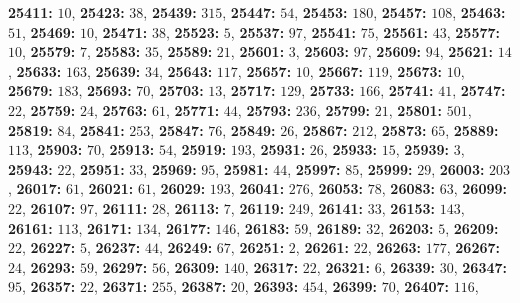 \textsf{\bfseries 25411:} $10$, \textsf{\bfseries 25423:} $38$, \textsf{\bfseries 25439:} $315$, \textsf{\bfseries 25447:} $54$, \textsf{\bfseries 25453:} $180$, \textsf{\bfseries 25457:} $108$, \textsf{\bfseries 25463:} $51$, \textsf{\bfseries 25469:} $10$, \textsf{\bfseries 25471:} $38$, \textsf{\bfseries 25523:} $5$, \textsf{\bfseries 25537:} $97$, \textsf{\bfseries 25541:} $75$, \textsf{\bfseries 25561:} $43$, \textsf{\bfseries 25577:} $10$, \textsf{\bfseries 25579:} $7$, \textsf{\bfseries 25583:} $35$, \textsf{\bfseries 25589:} $21$, \textsf{\bfseries 25601:} $3$, \textsf{\bfseries 25603:} $97$, \textsf{\bfseries 25609:} $94$, \textsf{\bfseries 25621:} $14$, \textsf{\bfseries 25633:} $163$, \textsf{\bfseries 25639:} $34$, \textsf{\bfseries 25643:} $117$, \textsf{\bfseries 25657:} $10$, \textsf{\bfseries 25667:} $119$, \textsf{\bfseries 25673:} $10$, \textsf{\bfseries 25679:} $183$, \textsf{\bfseries 25693:} $70$, \textsf{\bfseries 25703:} $13$, \textsf{\bfseries 25717:} $129$, \textsf{\bfseries 25733:} $166$, \textsf{\bfseries 25741:} $41$, \textsf{\bfseries 25747:} $22$, \textsf{\bfseries 25759:} $24$, \textsf{\bfseries 25763:} $61$, \textsf{\bfseries 25771:} $44$, \textsf{\bfseries 25793:} $236$, \textsf{\bfseries 25799:} $21$, \textsf{\bfseries 25801:} $501$, \textsf{\bfseries 25819:} $84$, \textsf{\bfseries 25841:} $253$, \textsf{\bfseries 25847:} $76$, \textsf{\bfseries 25849:} $26$, \textsf{\bfseries 25867:} $212$, \textsf{\bfseries 25873:} $65$, \textsf{\bfseries 25889:} $113$, \textsf{\bfseries 25903:} $70$, \textsf{\bfseries 25913:} $54$, \textsf{\bfseries 25919:} $193$, \textsf{\bfseries 25931:} $26$, \textsf{\bfseries 25933:} $15$, \textsf{\bfseries 25939:} $3$, \textsf{\bfseries 25943:} $22$, \textsf{\bfseries 25951:} $33$, \textsf{\bfseries 25969:} $95$, \textsf{\bfseries 25981:} $44$, \textsf{\bfseries 25997:} $85$, \textsf{\bfseries 25999:} $29$, \textsf{\bfseries 26003:} $203$, \textsf{\bfseries 26017:} $61$, \textsf{\bfseries 26021:} $61$, \textsf{\bfseries 26029:} $193$, \textsf{\bfseries 26041:} $276$, \textsf{\bfseries 26053:} $78$, \textsf{\bfseries 26083:} $63$, \textsf{\bfseries 26099:} $22$, \textsf{\bfseries 26107:} $97$, \textsf{\bfseries 26111:} $28$, \textsf{\bfseries 26113:} $7$, \textsf{\bfseries 26119:} $249$, \textsf{\bfseries 26141:} $33$, \textsf{\bfseries 26153:} $143$, \textsf{\bfseries 26161:} $113$, \textsf{\bfseries 26171:} $134$, \textsf{\bfseries 26177:} $146$, \textsf{\bfseries 26183:} $59$, \textsf{\bfseries 26189:} $32$, \textsf{\bfseries 26203:} $5$, \textsf{\bfseries 26209:} $22$, \textsf{\bfseries 26227:} $5$, \textsf{\bfseries 26237:} $44$, \textsf{\bfseries 26249:} $67$, \textsf{\bfseries 26251:} $2$, \textsf{\bfseries 26261:} $22$, \textsf{\bfseries 26263:} $177$, \textsf{\bfseries 26267:} $24$, \textsf{\bfseries 26293:} $59$, \textsf{\bfseries 26297:} $56$, \textsf{\bfseries 26309:} $140$, \textsf{\bfseries 26317:} $22$, \textsf{\bfseries 26321:} $6$, \textsf{\bfseries 26339:} $30$, \textsf{\bfseries 26347:} $95$, \textsf{\bfseries 26357:} $22$, \textsf{\bfseries 26371:} $255$, \textsf{\bfseries 26387:} $20$, \textsf{\bfseries 26393:} $454$, \textsf{\bfseries 26399:} $70$, \textsf{\bfseries 26407:} $116$, 
